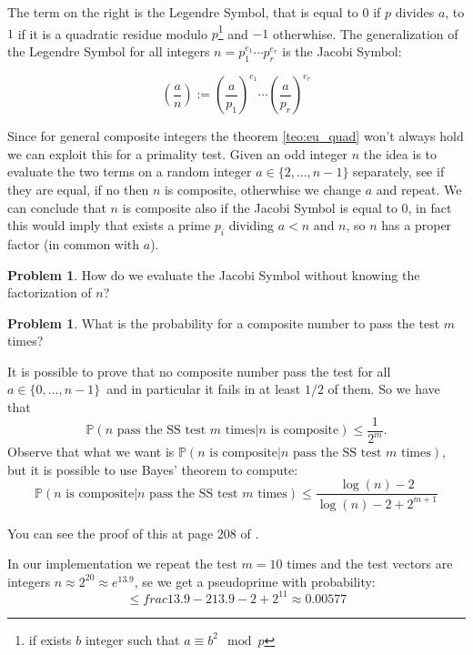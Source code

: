 \documentclass{article}
\newcommand{\PP}{\mathbb{P}}
\theoremstyle{plain}
\theoremstyle{remark}
\theoremstyle{definition}
\newtheorem{prob}[teo]{Problem}
\begin{document}
The term on the right is the Legendre Symbol, that is equal to $0$ if $p$ divides $a$, to $1$ if it is a quadratic residue modulo $p$\footnote{if exists $b$ integer such that $a \equiv b^2 \mod p$} and $-1$ otherwhise. The generalization of the Legendre Symbol for all integers $n = p_1^{e_1} \cdots p_r^{e_r}$ is the Jacobi Symbol: 

\[ \left(\dfrac{a}{n}\right) := \left(\dfrac{a}{p_1}\right)^{e_1} \cdots \left(\dfrac{a}{p_r}\right)^{e_r} \] 
	
Since for general composite integers the theorem \ref{teo:eu_quad} won't always hold we can exploit this for a primality test. Given an odd integer $n$ the idea is to evaluate the two terms on a random integer $a\in \{2,...,n-1\}$ separately, see if they are equal, if no then $n$ is composite, otherwhise we change $a$ and repeat. We can conclude that $n$ is composite also if the Jacobi Symbol is equal to $0$, in fact this would imply that exists a prime $p_i$ dividing $a<n$ and $n$, so $n$ has a proper factor (in common with $a$). 

\begin{prob}\label{prob:jacobi}
	How do we evaluate the Jacobi Symbol without knowing the factorization of $n$?
\end{prob}

\begin{prob}\label{prob:eff_ss}
	What is the probability for a composite number to pass the test $m$ times?
\end{prob}

It is possible to prove that no composite number pass the test for all $a\in\{0,...,n-1\}$ and in particular it fails in at least $1/2$ of them. So we have that 
\begin{equation}
	\label{eq:prob_SS}
\PP(n \text{ pass the SS test }m\text{ times}|n\text{ is composite})\leq \frac{1}{2^m} .
\end{equation}
Observe that what we want is $\PP(n\text{ is composite}|n \text{ pass the SS test }m\text{ times})$, but it is possible to use Bayes' theorem to compute:
\begin{equation}
	\label{eq:prob_SS_good}
	\PP(n\text{ is composite}|n \text{ pass the SS test }m\text{ times})
	\leq
	\frac{\log(n) - 2}{\log(n) - 2 + 2^{m+1}}
\end{equation}

You can see the proof of this at page 208 of \cite[Section 6.4.2]{stinson}.

In our implementation we repeat the test $m=10$ times and the test vectors are integers $n \approx 2^20 \approx e^{13.9}$, se we get a pseudoprime with probability:
\begin{equation*}
	\leq frac{13.9 - 2}{13.9 - 2 + 2^{11}} \approx 0.00577
\end{equation*}
\end{document}
